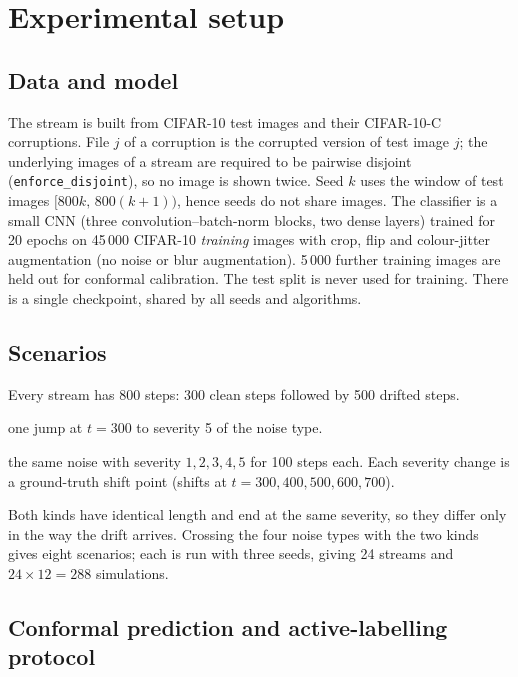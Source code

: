 \documentclass[11pt,a4paper]{article}
\begin{document}
\section{Experimental setup}
\label{sec:setup}

\subsection{Data and model}

The stream is built from CIFAR-10 test images and their CIFAR-10-C corruptions. File $j$ of a corruption is the corrupted version of
test image $j$; the underlying images of a stream are required to be pairwise disjoint (\texttt{enforce\_disjoint}),
so no image is shown twice. Seed $k$ uses the window of test images $[800k,\,800(k+1))$, hence seeds do not share images.
The classifier is a small CNN (three convolution--batch-norm blocks, two dense layers) trained for
20 epochs on 45\,000 CIFAR-10 \emph{training} images with crop, flip and colour-jitter augmentation (no noise or blur augmentation).
5\,000 further training images are held out for conformal calibration. The test split is never used for training.
There is a single checkpoint, shared by all seeds and algorithms.

\subsection{Scenarios}

Every stream has 800 steps: 300 clean steps followed by 500 drifted steps.
\begin{description}[nosep]
 \item[Sudden] one jump at $t=300$ to severity 5 of the noise type.
 \item[Gradual] the same noise with severity $1,2,3,4,5$ for 100 steps each. Each severity change is a ground-truth shift point (shifts at $t=300,400,500,600,700$).
\end{description}
Both kinds have identical length and end at the same severity, so they differ only in the way the drift arrives.
Crossing the four noise types with the two kinds gives eight scenarios; each is run with three seeds, giving 24 streams and
$24\times12=288$ simulations.

\subsection{Conformal prediction and active-labelling protocol}
\end{document}
